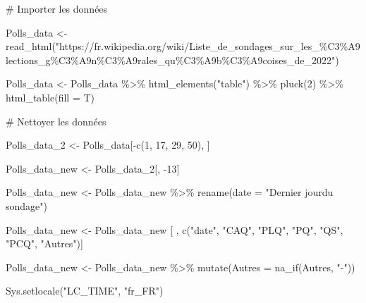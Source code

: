 \documentclass[
  letterpaper,
  DIV=11,
  numbers=noendperiod]{scrartcl}
\newenvironment{Shaded}{\begin{snugshade}}{\end{snugshade}}
\newcommand{\AttributeTok}[1]{\textcolor[rgb]{0.40,0.45,0.13}{#1}}
\newcommand{\CommentTok}[1]{\textcolor[rgb]{0.37,0.37,0.37}{#1}}
\newcommand{\DecValTok}[1]{\textcolor[rgb]{0.68,0.00,0.00}{#1}}
\newcommand{\FunctionTok}[1]{\textcolor[rgb]{0.28,0.35,0.67}{#1}}
\newcommand{\NormalTok}[1]{\textcolor[rgb]{0.00,0.23,0.31}{#1}}
\newcommand{\OtherTok}[1]{\textcolor[rgb]{0.00,0.23,0.31}{#1}}
\newcommand{\SpecialCharTok}[1]{\textcolor[rgb]{0.37,0.37,0.37}{#1}}
\newcommand{\StringTok}[1]{\textcolor[rgb]{0.13,0.47,0.30}{#1}}
\begin{document}
\begin{Shaded}
\begin{Highlighting}[]
\CommentTok{\# Importer les données}

\NormalTok{Polls\_data }\OtherTok{\textless{}{-}} \FunctionTok{read\_html}\NormalTok{(}\StringTok{"https://fr.wikipedia.org/wiki/Liste\_de\_sondages\_sur\_les\_\%C3\%A9lections\_g\%C3\%A9n\%C3\%A9rales\_qu\%C3\%A9b\%C3\%A9coises\_de\_2022"}\NormalTok{)}

\NormalTok{Polls\_data }\OtherTok{\textless{}{-}}\NormalTok{ Polls\_data }\SpecialCharTok{\%\textgreater{}\%} \FunctionTok{html\_elements}\NormalTok{(}\StringTok{"table"}\NormalTok{) }\SpecialCharTok{\%\textgreater{}\%} \FunctionTok{pluck}\NormalTok{(}\DecValTok{2}\NormalTok{) }\SpecialCharTok{\%\textgreater{}\%} \FunctionTok{html\_table}\NormalTok{(}\AttributeTok{fill =}\NormalTok{ T)}

\CommentTok{\# Nettoyer les données}

\NormalTok{Polls\_data\_2 }\OtherTok{\textless{}{-}}\NormalTok{ Polls\_data[}\SpecialCharTok{{-}}\FunctionTok{c}\NormalTok{(}\DecValTok{1}\NormalTok{, }\DecValTok{17}\NormalTok{, }\DecValTok{29}\NormalTok{, }\DecValTok{50}\NormalTok{), ]}

\NormalTok{Polls\_data\_new }\OtherTok{\textless{}{-}}\NormalTok{ Polls\_data\_2[, }\SpecialCharTok{{-}}\DecValTok{13}\NormalTok{]}

\NormalTok{Polls\_data\_new }\OtherTok{\textless{}{-}}\NormalTok{ Polls\_data\_new }\SpecialCharTok{\%\textgreater{}\%} \FunctionTok{rename}\NormalTok{(}\AttributeTok{date =} \StringTok{"Dernier jourdu sondage"}\NormalTok{)}

\NormalTok{Polls\_data\_new }\OtherTok{\textless{}{-}}\NormalTok{ Polls\_data\_new [ , }\FunctionTok{c}\NormalTok{(}\StringTok{"date"}\NormalTok{, }\StringTok{"CAQ"}\NormalTok{, }\StringTok{"PLQ"}\NormalTok{, }\StringTok{"PQ"}\NormalTok{, }\StringTok{"QS"}\NormalTok{, }\StringTok{"PCQ"}\NormalTok{, }\StringTok{"Autres"}\NormalTok{)]}

\NormalTok{Polls\_data\_new }\OtherTok{\textless{}{-}}\NormalTok{ Polls\_data\_new }\SpecialCharTok{\%\textgreater{}\%} \FunctionTok{mutate}\NormalTok{(}\AttributeTok{Autres =} \FunctionTok{na\_if}\NormalTok{(Autres, }\StringTok{"{-}"}\NormalTok{))}

\FunctionTok{Sys.setlocale}\NormalTok{(}\StringTok{"LC\_TIME"}\NormalTok{, }\StringTok{"fr\_FR"}\NormalTok{)}
\end{Highlighting}
\end{Shaded}
\end{document}

